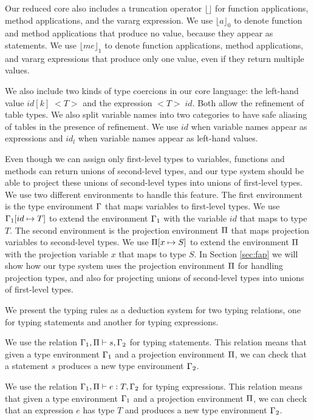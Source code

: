 Our reduced core also includes a truncation operator $\lfloor \rfloor$ for
function applications, method applications, and the vararg expression.
We use $\lfloor a \rfloor_{0}$ to denote function and method applications
that produce no value, because they appear as statements.
We use $\lfloor me \rfloor_{1}$ to denote function applications,
method applications, and vararg expressions that produce only one value,
even if they return multiple values.

We also include two kinds of type coercions in our core language:
the left-hand value $id[k] \; {<}T{>}$ and the expression ${<}T{>} \;id$.
Both allow the refinement of table types.
We also split variable names into two categories to have safe aliasing
of tables in the presence of refinement.
We use $id$ when variable names appear as expressions and $id_{l}$ when
variable names appear as left-hand values.

Even though we can assign only first-level types to variables,
functions and methods can return unions of second-level types,
and our type system should be able to project these unions of
second-level types into unions of first-level types.
We use two different environments to handle this feature.
The first environment is the type environment $\Gamma$ that maps
variables to first-level types.
We use $\Gamma_{1}[id \mapsto T]$ to extend the environment $\Gamma_{1}$
with the variable $id$ that maps to type $T$.
The second environment is the projection environment $\Pi$ that
maps projection variables to second-level types.
We use $\Pi[x \mapsto S]$ to extend the environment $\Pi$
with the projection variable $x$ that maps to type $S$.
In Section \ref{sec:fap} we will show how our type system uses the
projection environment $\Pi$ for handling projection types,
and also for projecting unions of second-level types into
unions of first-level types.

We present the typing rules as a deduction system for two typing relations,
one for typing statements and another for typing expressions.

We use the relation $\Gamma_{1}, \Pi \vdash s, \Gamma_{2}$ for typing statements.
This relation means that given a type environment $\Gamma_{1}$
and a projection environment $\Pi$, we can check that a statement $s$
produces a new type environment $\Gamma_{2}$.

We use the relation $\Gamma_{1}, \Pi \vdash e : T, \Gamma_{2}$ for typing expressions.
This relation means that given a type environment $\Gamma_{1}$
and a projection environment $\Pi$, we can check that an expression $e$ has
type $T$ and produces a new type environment $\Gamma_{2}$.

